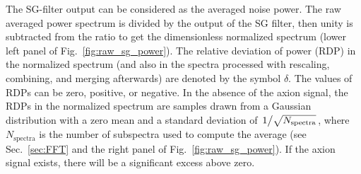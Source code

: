 The SG-filter output can be considered as the averaged noise power. 
The raw averaged power spectrum is divided by the output of the SG filter, 
then unity is subtracted from the ratio to get the dimensionless 
normalized spectrum (lower left panel of Fig.~\ref{fig:raw_sg_power}). %
The relative deviation of power (RDP) in the normalized spectrum (and also in 
the spectra processed with rescaling, combining, and merging afterwards) are 
denoted by the symbol $\delta$. The values of 
RDPs can be zero, positive, or negative. 
In the absence of the axion signal, the RDPs in the normalized spectrum are 
samples drawn from a Gaussian 
distribution with a zero mean and a standard deviation of 
$\left.1\middle/\sqrt{N_\text{spectra}}\right.$, where $N_\text{spectra}$ is 
the number of subspectra used to compute the average (see Sec.~\ref{sec:FFT} 
and the right panel of Fig.~\ref{fig:raw_sg_power}). 
If the axion signal exists, there will be a significant excess above zero. 
 
